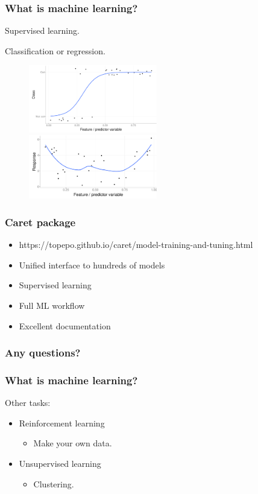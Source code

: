 \documentclass[handout, aspectratio = 169]{beamer}
\begin{document}
\begin{frame}
\frametitle{What is machine learning?}
Supervised learning.

Classification or regression.
\begin{figure}
    \includegraphics[width = 0.5\textwidth]{classification}%
    \includegraphics[width = 0.5\textwidth]{regression}
\end{figure} 

\end{frame} 


\begin{frame}
\frametitle{Caret package}
\begin{itemize}
\item https://topepo.github.io/caret/model-training-and-tuning.html
\item Unified interface to hundreds of models
\item Supervised learning
\item Full ML workflow
\item Excellent documentation
\end{itemize}

\end{frame} 



\begin{frame}
\frametitle{Any questions?}


\end{frame} 


\begin{frame}
\frametitle{What is machine learning?}
Other tasks:
\begin{itemize}
\item Reinforcement learning
\begin{itemize}
\item Make your own data.
\end{itemize}
\item Unsupervised learning
\begin{itemize}
\item Clustering.
\end{itemize}
\end{itemize}
\end{frame} 
\end{document}
